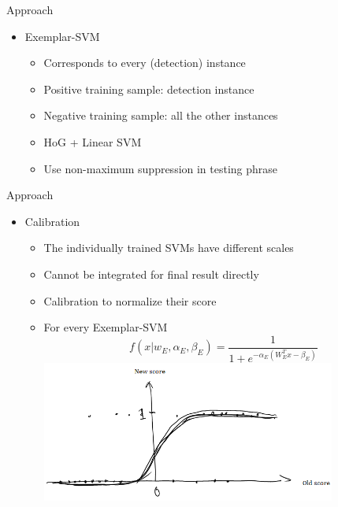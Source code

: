 \documentclass[12pt]{beamer}
\begin{document}
\begin{frame}{Approach}
	\begin{itemize}
		\item Exemplar-SVM
		\begin{itemize}
			\item Corresponds to every (detection) instance
			\item Positive training sample: detection instance
			\item Negative training sample: all the other instances
			\item HoG + Linear SVM
			\item Use non-maximum suppression in testing phrase
		\end{itemize}
	\end{itemize}
\end{frame}

\begin{frame}{Approach}
	\begin{itemize}
		\item Calibration
		\begin{itemize}
			\item The individually trained SVMs have different scales
			\item Cannot be integrated for final result directly
			\item Calibration to normalize their score
			\item For every Exemplar-SVM
			\[f(x|w_E,\alpha_E,\beta_E) = \frac{1}{1 + e^{-\alpha_E(W_E^Tx-\beta_E)}}\]
			\includegraphics[width=0.8\textwidth]{esvm-calibration.png}
		\end{itemize}
	\end{itemize}
\end{frame}
\end{document}
